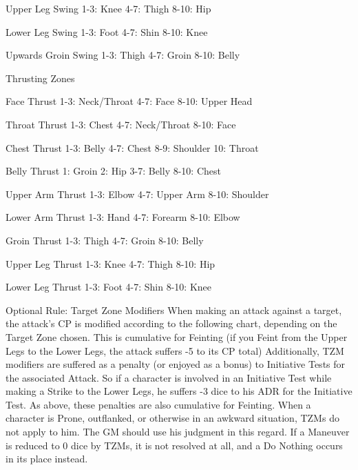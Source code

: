 \documentclass[oneside,11pt,english]{book}
\begin{document}
 

Upper Leg Swing 
1-3: Knee 
4-7: Thigh 
8-10: Hip 

 

Lower Leg Swing 
1-3: Foot 
4-7: Shin 
8-10: Knee 

 

Upwards Groin Swing 
1-3: Thigh 
4-7: Groin 
8-10: Belly 

 

 


Thrusting Zones 

 

Face Thrust 
1-3: Neck/Throat 
4-7: Face 
8-10: Upper Head 

 

Throat Thrust 
1-3: Chest 
4-7: Neck/Throat 
8-10: Face 

 

Chest Thrust 
1-3: Belly 
4-7: Chest 
8-9: Shoulder 
10: Throat 

 

Belly Thrust 
1: Groin 
2: Hip 
3-7: Belly 
8-10: Chest 

 

Upper Arm Thrust 
1-3: Elbow 
4-7: Upper Arm 
8-10: Shoulder 

 

Lower Arm Thrust 
1-3: Hand 
4-7: Forearm 
8-10: Elbow 

 

Groin Thrust 
1-3: Thigh 
4-7: Groin 
8-10: Belly 

 

Upper Leg Thrust 
1-3: Knee 
4-7: Thigh 
8-10: Hip 

 

Lower Leg Thrust 
1-3: Foot 
4-7: Shin 
8-10: Knee 

 

 


Optional Rule: Target Zone Modifiers 
When making an attack against a target, the attack's CP is modified according to the following chart, 
depending on the Target Zone chosen. This is cumulative for Feinting (if you Feint from the Upper 
Legs to the Lower Legs, the attack suffers -5 to its CP total) 
Additionally, TZM modifiers are suffered as a penalty (or enjoyed as a bonus) to Initiative Tests for the 
associated Attack. So if a character is involved in an Initiative Test while making a Strike to the Lower 
Legs, he suffers -3 dice to his ADR for the Initiative Test. As above, these penalties are also cumulative 
for Feinting. 
When a character is Prone, outflanked, or otherwise in an awkward situation, TZMs do not apply to 
him. The GM should use his judgment in this regard. 
If a Maneuver is reduced to 0 dice by TZMs, it is not resolved at all, and a Do Nothing occurs in its 
place instead. 
\end{document}
